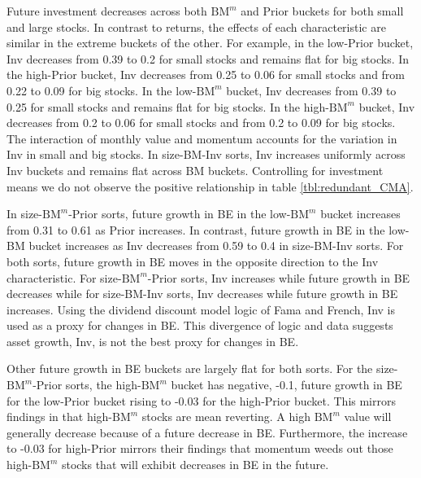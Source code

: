 Future investment decreases across both $\text{BM}^m$ and Prior buckets for
both small and large stocks. In contrast to returns, the effects of each
characteristic are similar in the extreme buckets of the other. For example, in
the low-Prior bucket, Inv decreases from 0.39 to 0.2 for small stocks and
remains flat for big stocks. In the high-Prior bucket, Inv decreases from 0.25
to 0.06 for small stocks and from 0.22 to 0.09 for big stocks. In the
low-$\text{BM}^m$ bucket, Inv decreases from 0.39 to 0.25 for small stocks and
remains flat for big stocks. In the high-$\text{BM}^m$ bucket, Inv decreases
from 0.2 to 0.06 for small stocks and from 0.2 to 0.09 for big stocks. The
interaction of monthly value and momentum accounts for the variation in Inv in
small and big stocks. In size-BM-Inv sorts, Inv increases uniformly across Inv
buckets and remains flat across BM buckets. Controlling for investment means we
do not observe the positive relationship in table \ref{tbl:redundant_CMA}.

In size-$\text{BM}^m$-Prior sorts, future growth in BE in the low-$\text{BM}^m$
bucket increases from 0.31 to 0.61 as Prior increases. In contrast, future
growth in BE in the low-BM bucket increases as Inv decreases from 0.59 to 0.4
in size-BM-Inv sorts. For both sorts, future growth in BE moves in the opposite
direction to the Inv characteristic. For size-$\text{BM}^m$-Prior sorts, Inv
increases while future growth in BE decreases while for size-BM-Inv sorts, Inv
decreases while future growth in BE increases. Using the dividend discount
model logic of Fama and French, Inv is used as a proxy for changes in BE. This
divergence of logic and data suggests asset growth, Inv, is not the best proxy
for changes in BE.

Other future growth in BE buckets are largely flat for both sorts. For the
size-$\text{BM}^m$-Prior sorts, the high-$\text{BM}^m$ bucket has negative,
-0.1, future growth in BE for the low-Prior bucket rising to -0.03 for the
high-Prior bucket. This mirrors findings in \textcite{kok2017facts} that
high-$\text{BM}^m$ stocks are mean reverting. A high $\text{BM}^m$ value will
generally decrease because of a future decrease in BE. Furthermore, the
increase to -0.03 for high-Prior mirrors their findings that momentum weeds out
those high-$\text{BM}^m$ stocks that will exhibit decreases in BE in the
future.
